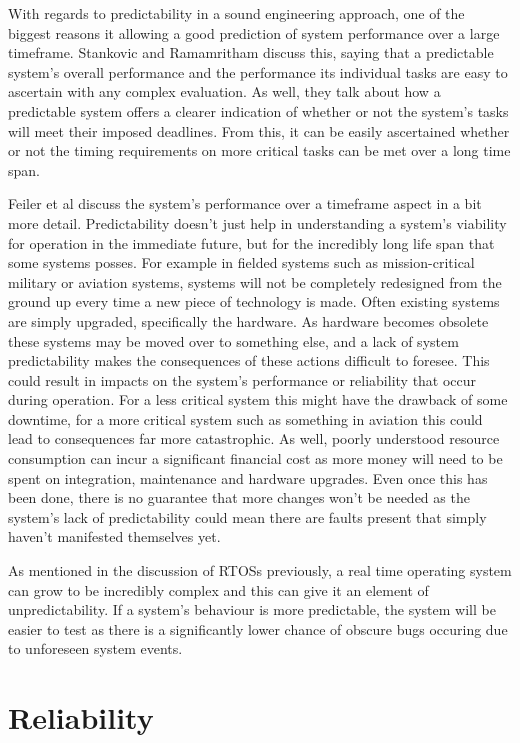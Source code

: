 \documentclass[]{report}
\begin{document}
		With regards to predictability in a sound engineering approach, one of the biggest reasons it allowing a good prediction of system performance over a large timeframe. Stankovic and Ramamritham\cite{Stankovic93whatis} discuss this, saying that a predictable system's overall performance and the performance its individual tasks are easy to ascertain with any complex evaluation. As well, they talk about how a predictable system offers a clearer indication of whether or not the system's tasks will meet their imposed deadlines. From this, it can be easily ascertained whether or not the timing requirements on more critical tasks can be met over a long time span. 
		
		Feiler et al\cite{feiler2000improving} discuss the system's performance over a timeframe aspect in a bit more detail. Predictability doesn't just help in understanding a system's viability for operation in the immediate future, but for the incredibly long life span that some systems posses. For example in fielded systems such as mission-critical military or aviation systems, systems will not be completely redesigned from the ground up every time a new piece of technology is made. Often existing systems are simply upgraded, specifically the hardware. As hardware becomes obsolete these systems may be moved over to something else, and a lack of system predictability makes the consequences of these actions difficult to foresee. This could result in impacts on the system's performance or reliability that occur during operation. For a less critical system this might have the drawback of some downtime, for a more critical system such as something in aviation this could lead to consequences far more catastrophic.  As well, poorly understood resource consumption can incur a significant financial cost as more money will need to be spent on integration, maintenance and hardware upgrades. Even once this has been done, there is no guarantee that more changes won't be needed as the system's lack of predictability could mean there are faults present that simply haven't manifested themselves yet.
		
		As mentioned in the discussion of RTOSs previously, a real time operating system can grow to be incredibly complex and this can give it an element of unpredictability. If a system's behaviour is more predictable, the system will be easier to test as there is a significantly lower chance of obscure bugs occuring due to unforeseen system events.
	
	\chapter{Reliability}
\end{document}
